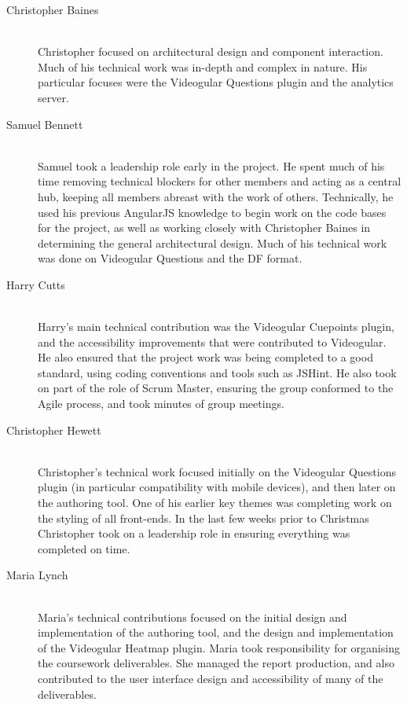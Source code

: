 \begin{description}
	\item[Christopher Baines] \hfill \\
		Christopher focused on architectural design and component interaction. Much of his technical work was in-depth and complex in nature. His particular focuses were the Videogular Questions plugin and the analytics server.
	\item[Samuel Bennett] \hfill \\
		Samuel took a leadership role early in the project. He spent much of his time removing technical blockers for other members and acting as a central hub, keeping all members abreast with the work of others. Technically, he used his previous \gls{AngularJS} knowledge to begin work on the code bases for the project, as well as working closely with Christopher Baines in determining the general architectural design. Much of his technical work was done on Videogular Questions and the \gls{DF} format.
	\item[Harry Cutts] \hfill \\
		Harry's main technical contribution was the Videogular Cuepoints plugin, and the accessibility improvements that were contributed to \gls{Videogular}. He also ensured that the project work was being completed to a good standard, using coding conventions and tools such as JSHint. He also took on part of the role of Scrum Master, ensuring the group conformed to the Agile process, and took minutes of group meetings.
	\item[Christopher Hewett] \hfill \\
		Christopher's technical work focused initially on the Videogular Questions plugin (in particular compatibility with mobile devices), and then later on the authoring tool. One of his earlier key themes was completing work on the styling of all front-ends. In the last few weeks prior to Christmas Christopher took on a leadership role in ensuring everything was completed on time.
	\item[Maria Lynch] \hfill \\
		Maria's technical contributions focused on the initial design and implementation of the authoring tool, and the design and implementation of the Videogular Heatmap plugin. Maria took responsibility for organising the coursework deliverables. She managed the report production, and also contributed to the user interface design and accessibility of many of the deliverables.
\end{description}

